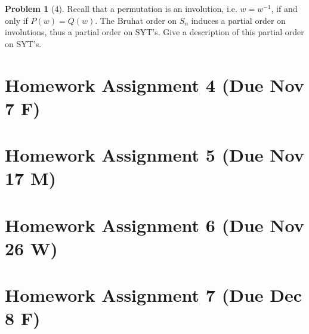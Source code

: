 \documentclass{amsart}
\theoremstyle{plain}
\theoremstyle{definition}
\newtheorem{problem}[theorem]{Problem}
\begin{document}
\begin{problem}[4]
	Recall that a permutation is an involution, i.e. $w=w^{-1}$, if and only if $P(w)=Q(w)$. The Bruhat order on $S_n$ induces a partial order on involutions, thus a partial order on SYT's. Give a description of this partial order on SYT's.
\end{problem}
	\section{Homework Assignment 4 (Due Nov 7 F)}
	\section{Homework Assignment 5 (Due Nov 17 M)}
	\section{Homework Assignment 6 (Due Nov 26 W)}
	\section{Homework Assignment 7 (Due Dec 8 F)}


	
	
	
	
	
	
	
	
\end{document}
